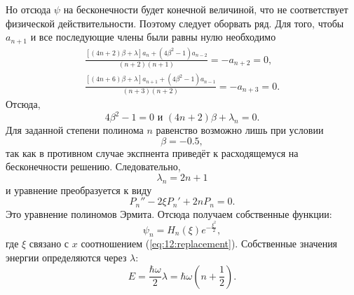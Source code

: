 Но отсюда \( \psi \) на бесконечности будет конечной величиной, что не
соответствует физической действительности. Поэтому следует оборвать ряд.
Для того, чтобы \( a_{n+1}\) и все последующие члены были равны нулю необходимо
\begin{gather*}
    \frac{[(4n+2)\beta+\lambda] a_n + (4\beta^2-1)a_{n-2}}{(n+2)(n+1)} = 
    -a_{n+2} = 0, \\
    \frac{[(4n+6)\beta+\lambda] a_{n+1} + (4\beta^2-1)a_{n-1}}{(n+3)(n+2)} = 
    -a_{n+3} = 0.
\end{gather*}
Отсюда,
\[
    4\beta^2-1 = 0 \text{ и } (4n+2)\beta + \lambda_n = 0. 
\]
Для заданной степени полинома \( n \) равенство возможно лишь при условии
\[
    \beta = -0.5,
\]
так как в противном случае экспнента приведёт к расходящемуся на бесконечности
решению. Следовательно,
\[
    \lambda_n = 2n+1
\]
и уравнение преобразуется к виду
\[
    P_n'' - 2\xi P_n' + 2nP_n = 0.
\]
Это уравнение полиномов Эрмита. Отсюда получаем собственные функции:
\[
    \psi_n = H_n(\xi)e^{-\frac{\xi^2}{2}},
\]
где \( \xi \) связано с \( x \) соотношением (\ref{eq:12:replacement}).
Собственные значения энергии определяются через \( \lambda \):
\[
    E = \frac{\hbar\omega}{2}\lambda = \hbar\omega\left(n + \frac{1}{2}\right).
\]

